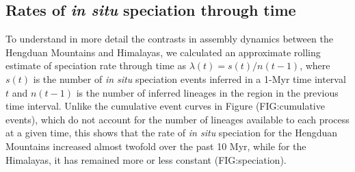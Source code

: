 \subsection{Rates of \textit{in situ} speciation through time}

To understand in more detail the contrasts in assembly dynamics between the Hengduan Mountains and Himalayas, we calculated an approximate rolling estimate of speciation rate through time as $\lambda(t) = s(t)/n(t-1)$, where $s(t)$ is the number of \textit{in situ} speciation events inferred in a 1-Myr time interval $t$ and $n(t-1)$ is the number of inferred lineages in the region in the previous time interval. Unlike the cumulative event curves in Figure (FIG:cumulative events), which do not account for the number of lineages available to each process at a given time, this shows that the rate of \textit{in situ} speciation for the Hengduan Mountains increased almost twofold over the past 10 Myr, while for the Himalayas, it has remained more or less constant (FIG:speciation).